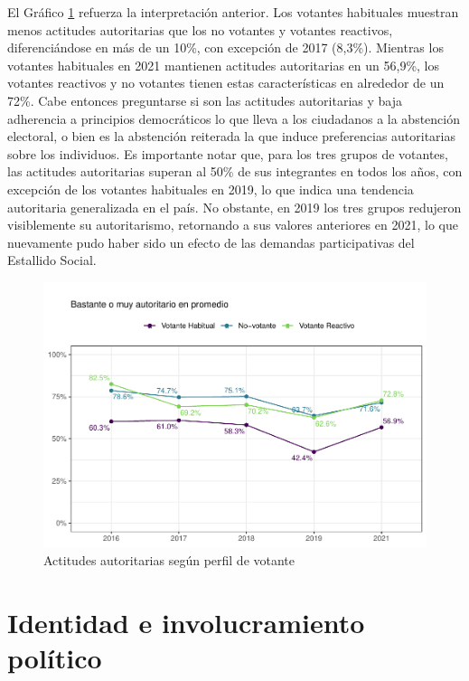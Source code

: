 \documentclass[
  12pt,
]{book}
\begin{document}
El Gráfico \ref{fig:graf-autoritarismo-2} refuerza la interpretación anterior. Los votantes habituales muestran menos actitudes autoritarias que los no votantes y votantes reactivos, diferenciándose en más de un 10\%, con excepción de 2017 (8,3\%). Mientras los votantes habituales en 2021 mantienen actitudes autoritarias en un 56,9\%, los votantes reactivos y no votantes tienen estas características en alrededor de un 72\%. Cabe entonces preguntarse si son las actitudes autoritarias y baja adherencia a principios democráticos lo que lleva a los ciudadanos a la abstención electoral, o bien es la abstención reiterada la que induce preferencias autoritarias sobre los individuos. Es importante notar que, para los tres grupos de votantes, las actitudes autoritarias superan al 50\% de sus integrantes en todos los años, con excepción de los votantes habituales en 2019, lo que indica una tendencia autoritaria generalizada en el país. No obstante, en 2019 los tres grupos redujeron visiblemente su autoritarismo, retornando a sus valores anteriores en 2021, lo que nuevamente pudo haber sido un efecto de las demandas participativas del Estallido Social.

\begin{figure}

{\centering \includegraphics{reporte-elsoc_files/figure-latex/graf-autoritarismo-2-1} 

}

\caption{Actitudes autoritarias según perfil de votante}\label{fig:graf-autoritarismo-2}
\end{figure}

\hypertarget{identidad-e-involucramiento-poluxedtico}{%
\section{Identidad e involucramiento político}\label{identidad-e-involucramiento-poluxedtico}}
\end{document}

